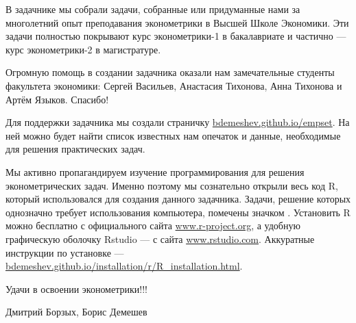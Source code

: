 \documentclass[11pt, openany]{book}
\theoremstyle{definition}
\begin{document}
\vspace{30pt}

В задачнике мы собрали задачи, собранные или придуманные нами за многолетний опыт преподавания эконометрики в Высшей Школе Экономики. Эти задачи полностью покрывают курс эконометрики-1 в бакалавриате и частично — курс эконометрики-2 в магистратуре.

Огромную помощь в создании задачника оказали нам замечательные студенты факультета экономики: Сергей Васильев, Анастасия Тихонова, Анна Тихонова и Артём Языков. Спасибо!

Для поддержки задачника мы создали страничку \url{bdemeshev.github.io/empset}. На ней можно будет найти список известных нам опечаток и данные, необходимые для решения практических задач.

Мы активно пропагандируем изучение программирования для решения эконометрических задач. Именно поэтому мы сознательно открыли  весь код R,  который использовался для создания данного задачника. Задачи, решение которых однозначно требует использования компьютера, помечены значком \useR. Установить R можно бесплатно с официального сайта \url{www.r-project.org}, а удобную графическую оболочку Rstudio — с сайта \url{www.rstudio.com}. Аккуратные инструкции по установке — \url{bdemeshev.github.io/installation/r/R_installation.html}.

\vspace{30pt}

Удачи в освоении эконометрики!!!

\vspace{20pt}

\begin{flushright}
Дмитрий Борзых, Борис Демешев
\end{flushright}

























\end{document}
